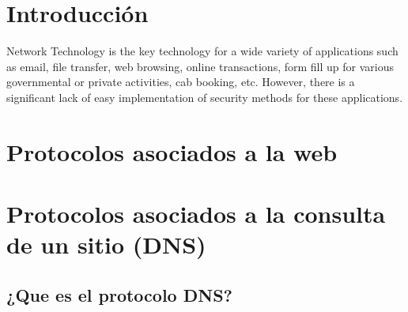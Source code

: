 
\section{Introducción}
Network Technology is the key technology for a wide variety of applications such as
email, file transfer, web browsing, online transactions, form fill up for various governmental or private activities, cab booking, etc. However, there is a significant lack of
easy implementation of security methods for these applications. 
\section{Protocolos asociados a la web}
    


\section{Protocolos asociados a la consulta de un sitio (DNS)}
    \subsection{¿Que es el protocolo DNS?} 





